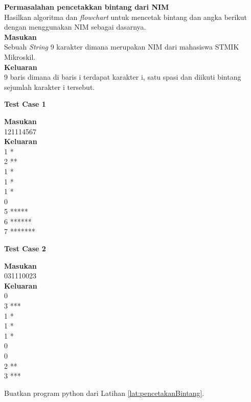 \begin{konsep}
\label{lat:pencetakanBintang}
\textbf{Permasalahan pencetakkan bintang dari NIM}\\
Hasilkan algoritma dan \textit{flowchart} untuk mencetak bintang dan angka berikut dengan menggunakan NIM sebagai dasarnya.\\
\textbf{Masukan}\\
Sebuah \textit{String} 9 karakter dimana merupakan NIM dari mahasiswa STMIK Mikroskil.\\
\textbf{Keluaran}\\
9 baris dimana di baris i terdapat karakter i, satu spasi dan diikuti bintang sejumlah karakter i tersebut.\\
\begin{center}
\textbf{Test Case 1}\\
\end{center}
\textbf{Masukan}\\
121114567\\
\textbf{Keluaran}\\
1 * \\
2 ** \\
1 * \\
1 * \\
1 * \\
0 \\
5 ***** \\
6 ****** \\
7 ******* \\
\begin{center}
\textbf{Test Case 2}\\
\end{center}
\textbf{Masukan}\\
031110023\\
\textbf{Keluaran}\\
0  \\
3 *** \\
1 * \\
1 * \\
1 * \\
0 \\
0 \\
2 ** \\
3 *** \\
\end{konsep}

\begin{pemrograman}
Buatkan program python dari Latihan \ref{lat:pencetakanBintang}.
\end{pemrograman}
